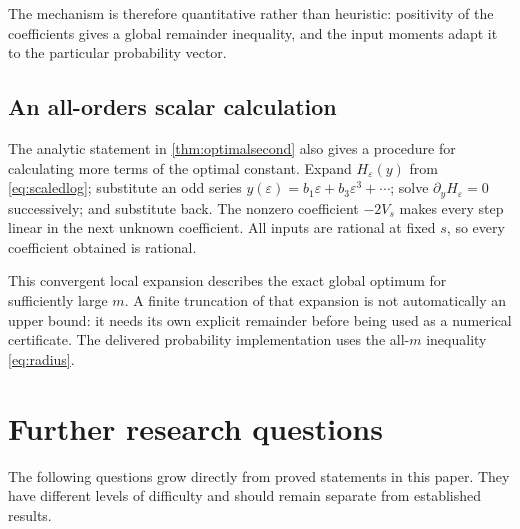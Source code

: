 \documentclass[11pt,a4paper]{article}
\theoremstyle{definition}
\begin{document}
The mechanism is therefore quantitative rather than heuristic: positivity
of the coefficients gives a global remainder inequality, and the input
moments adapt it to the particular probability vector.

\subsection{An all-orders scalar calculation}

The analytic statement in \cref{thm:optimalsecond} also gives a procedure
for calculating more terms of the optimal constant. Expand
$H_\varepsilon(y)$ from \eqref{eq:scaledlog}; substitute an odd series
$y(\varepsilon)=b_1\varepsilon+b_3\varepsilon^3+\cdots$; solve
$\partial_yH_\varepsilon=0$ successively; and substitute back.
The nonzero coefficient $-2V_s$ makes every step linear in the next
unknown coefficient. All inputs are rational at fixed $s$, so every
coefficient obtained is rational.

This convergent local expansion describes the exact global optimum for
sufficiently large $m$. A finite truncation of that expansion is not
automatically an upper bound: it needs its own explicit remainder before
being used as a numerical certificate. The delivered probability
implementation uses the all-$m$ inequality \eqref{eq:radius}.

\section{Further research questions}\label{sec:future}

The following questions grow directly from proved statements in this
paper. They have different levels of difficulty and should remain
separate from established results.
\end{document}

